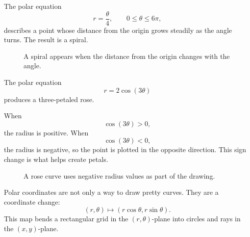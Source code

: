 \begin{example}
The polar equation
\[
    r=\frac{\theta}{4},
    \qquad 0\le\theta\le6\pi,
\]
describes a point whose distance from the origin grows steadily as the angle turns.
The result is a spiral.

\begin{figure}[h]
\centering
{}
\caption{A spiral appears when the distance from the origin changes with the angle.}
\end{figure}
\end{example}

\begin{example}
The polar equation
\[
    r=2\cos(3\theta)
\]
produces a three-petaled rose.

When
\[
    \cos(3\theta)>0,
\]
the radius is positive.  When
\[
    \cos(3\theta)<0,
\]
the radius is negative, so the point is plotted in the opposite direction.  This sign
change is what helps create petals.

\begin{figure}[h]
\centering
{}
\caption{A rose curve uses negative radius values as part of the drawing.}
\end{figure}
\end{example}

Polar coordinates are not only a way to draw pretty curves.  They are a coordinate
change:
\[
    (r,\theta)\longmapsto (r\cos\theta,r\sin\theta).
\]
This map bends a rectangular grid in the \((r,\theta)\)-plane into circles and rays in
the \((x,y)\)-plane.

